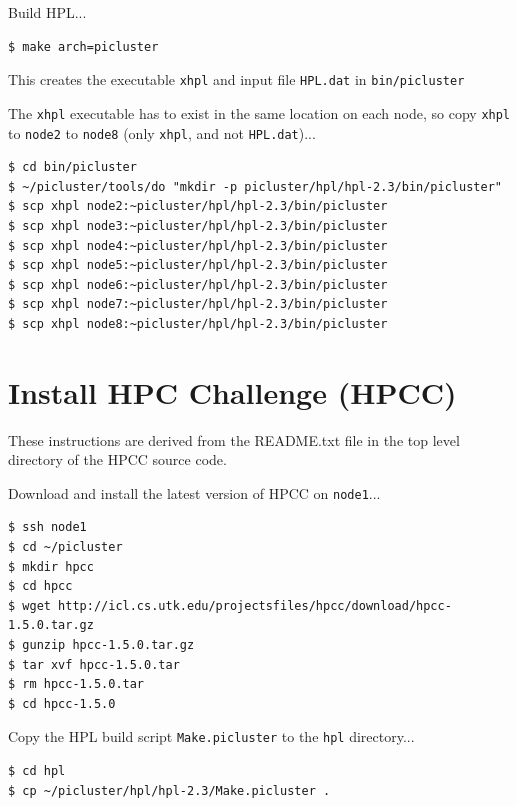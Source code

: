 \documentclass{report}
\begin{document}
\lstset{style=listingstyle}


Build HPL...

\lstset{style=type}
\begin{lstlisting}
$ make arch=picluster   
\end{lstlisting}

This creates the executable \verb|xhpl| and input file \verb|HPL.dat| in \verb|bin/picluster|

The \verb|xhpl| executable has to exist in the same location on each node, so copy \verb|xhpl| to \verb|node2| to \verb|node8| (only \verb|xhpl|, and not \verb|HPL.dat|)...

\lstset{style=type}
\begin{lstlisting}
$ cd bin/picluster
$ ~/picluster/tools/do "mkdir -p picluster/hpl/hpl-2.3/bin/picluster"
$ scp xhpl node2:~picluster/hpl/hpl-2.3/bin/picluster
$ scp xhpl node3:~picluster/hpl/hpl-2.3/bin/picluster
$ scp xhpl node4:~picluster/hpl/hpl-2.3/bin/picluster
$ scp xhpl node5:~picluster/hpl/hpl-2.3/bin/picluster
$ scp xhpl node6:~picluster/hpl/hpl-2.3/bin/picluster
$ scp xhpl node7:~picluster/hpl/hpl-2.3/bin/picluster
$ scp xhpl node8:~picluster/hpl/hpl-2.3/bin/picluster
\end{lstlisting}


%
%
\chapter{Install HPC Challenge (HPCC)}

These instructions are derived from the README.txt file in the top level directory of the HPCC source code.

Download and install the latest version of HPCC on \verb|node1|...

\lstset{style=type}
\begin{lstlisting}
$ ssh node1
$ cd ~/picluster
$ mkdir hpcc
$ cd hpcc
$ wget http://icl.cs.utk.edu/projectsfiles/hpcc/download/hpcc-1.5.0.tar.gz
$ gunzip hpcc-1.5.0.tar.gz
$ tar xvf hpcc-1.5.0.tar
$ rm hpcc-1.5.0.tar
$ cd hpcc-1.5.0
\end{lstlisting}

Copy the HPL build script \verb|Make.picluster| to the \verb|hpl| directory...

\lstset{style=type}
\begin{lstlisting}
$ cd hpl
$ cp ~/picluster/hpl/hpl-2.3/Make.picluster .
\end{lstlisting}
\end{document}
